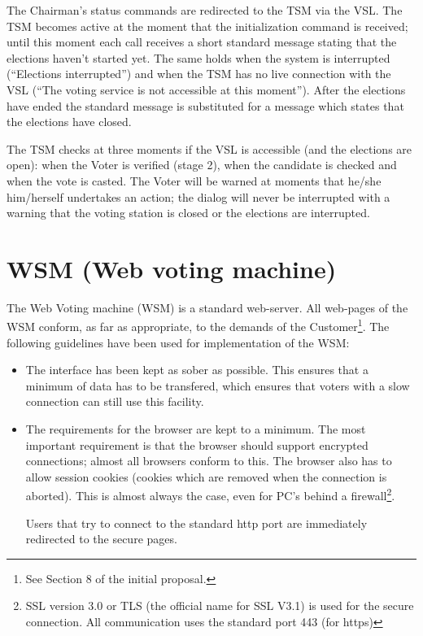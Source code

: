 The Chairman's status commands are redirected to the TSM via the
VSL. The TSM becomes active at the moment that the initialization
command is received; until this moment each call receives a short
standard message stating that the elections haven't started yet. The
same holds when the system is interrupted (``Elections interrupted'')
and when the TSM has no live connection with the VSL (``The voting
service is not accessible at this moment''). After the elections have
ended the standard message is substituted for a message which states
that the elections have closed.

The TSM checks at three moments if the VSL is accessible (and the
elections are open): when the Voter is verified (stage 2), when the
candidate is checked and when the vote is casted. The Voter will be
warned at moments that he/she him/herself undertakes an action; the
dialog will never be interrupted with a warning that the voting
station is closed or the elections are interrupted.

\section{WSM (Web voting machine)}\label{sec2:wsm-web-voting}

The Web Voting machine (WSM) is a standard web-server. All web-pages
of the WSM conform, as far as appropriate, to the demands of the
Customer\footnote{See Section 8 of the initial proposal.}. The following
guidelines have been used for implementation of the WSM:

\begin{itemize}
	\item The interface has been kept as sober as possible. This
	ensures that a minimum of data has to be transfered, which
	ensures that voters with a slow connection can still use this
	facility.
	
	\item The requirements for the browser are kept to a
	minimum. The most important requirement is that the browser
	should support encrypted connections; almost all browsers
	conform to this. The browser also has to allow session cookies
	(cookies which are removed when the connection is
	aborted). This is almost always the case, even for PC's behind
	a firewall\footnote{SSL version 3.0 or TLS (the official name
	for SSL V3.1) is used for the secure connection. All
	communication uses the standard port 443 (for https)}.

	Users that try to connect to the standard http port are
	immediately redirected to the secure pages.

\end{itemize}

